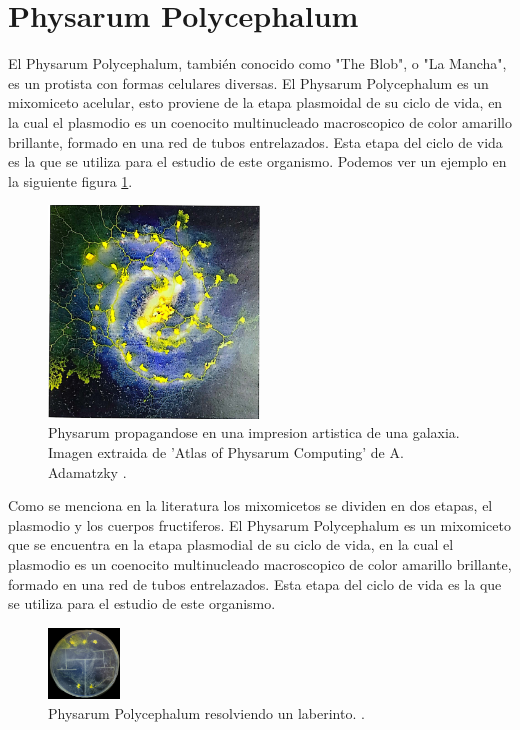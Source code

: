 \section{Physarum Polycephalum}
\label{sec:physarum}
    El Physarum Polycephalum, tambi\'en conocido como "The Blob", 
        o "La Mancha", es un protista con formas celulares diversas. El Physarum Polycephalum
        es un mixomiceto acelular, esto proviene de la etapa plasmoidal de su ciclo de vida,
        en la cual el plasmodio es un coenocito multinucleado macroscopico de color amarillo 
        brillante, formado en una red de tubos entrelazados. Esta etapa del ciclo de vida es 
        la que se utiliza para el estudio de este organismo.\cite{Dee1960} Podemos ver un ejemplo
        en la siguiente figura \ref{fig:PhysarumPolycephalum01}.
    \begin{figure}[h]  
        \centering
        \includegraphics[width=0.5\textwidth]{./images/PhyrasumPolycephalum01.png}
        \caption{Physarum propagandose en una impresion artistica de una galaxia. Imagen extraida de 'Atlas of Physarum Computing' de A. Adamatzky \cite{Adamatzky2014}.}
        \label{fig:PhysarumPolycephalum01}
    \end{figure} 
    \vskip 0.5cm
    Como se menciona en la literatura los mixomicetos se dividen en dos etapas, el plasmodio y los cuerpos fructiferos.
        El Physarum Polycephalum es un mixomiceto que se encuentra en la etapa plasmodial de su ciclo de vida, 
        en la cual el plasmodio es un coenocito multinucleado macroscopico de color amarillo brillante, formado en una red de tubos entrelazados.
        Esta etapa del ciclo de vida es la que se utiliza para el estudio de este organismo.\cite{Dee1960}
    \begin{figure}
        \centering
        \includegraphics[width=0.17\textwidth]{./images/LaberintoPhysarum.png}
        \caption{Physarum Polycephalum resolviendo un laberinto. \cite{Adamatzky2014}.}
        \label{fig:PhysarumPolycephalum02}
    \end{figure}
